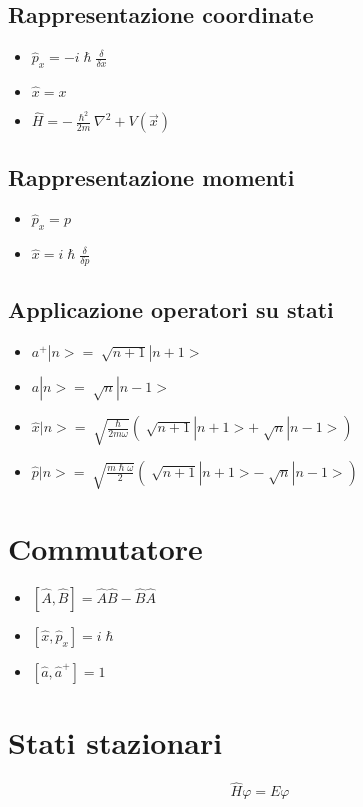 \subsection{Rappresentazione coordinate}
\begin{itemize}
    \item $\hat{p}_x = -i\hslash \frac{\delta}{\delta x}$
    \item $\hat{x} = x$
    \item $\hat{H} =-\frac{\hslash^2}{2m}\nabla^2 + V(\vec{x})$
\end{itemize}
\subsection{Rappresentazione momenti}
\begin{itemize}
    \item $\hat{p}_x = p$
    \item $\hat{x} = i\hslash\frac{\delta}{\delta p}$
\end{itemize}
\subsection{Applicazione operatori su stati}
\begin{itemize}
    \item $a^+|n> = \sqrt[]{n+1}|n+1>$
    \item $a|n> = \sqrt[]{n}|n-1>$
    \item $\hat{x}|n> = \sqrt[]{\frac{\hslash}{2m\omega}}(\sqrt[]{n+1}|n+1> + \sqrt[]{n}|n-1>)$
    \item $\hat{p}|n> = \sqrt[]{\frac{m\hslash\omega}{2}}(\sqrt[]{n+1}|n+1> - \sqrt[]{n}|n-1>)$
\end{itemize}

\section{Commutatore}
\begin{itemize}
    \item $[\hat{A},\hat{B}] = \hat{A}\hat{B}-\hat{B}\hat{A}$
    \item $[\hat{x},\hat{p}_x] = i\hslash$
    \item $[\hat{a},\hat{a}^+] = 1$
\end{itemize}

\section{Stati stazionari}
\begin{equation*}
    \hat{H}\varphi = E\varphi  
\end{equation*}

